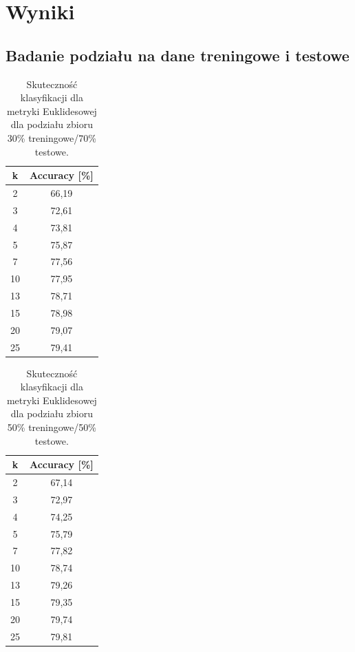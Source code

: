 \documentclass{classrep}
\begin{document}
\newpage
\section{Wyniki} %
\subsection{Badanie podziału na dane treningowe i testowe}

\begin{table}[h!]
	\centering
	\begin{tabular} {c c}
		\hline
		\textbf{k} & \textbf{Accuracy [\%]} \\ [0.5ex] 
		\hline
		\hline 
		2 & 66,19 \\ 
		3 & 72,61 \\
		4 & 73,81 \\
		5 & 75,87 \\
		7 & 77,56 \\
		10 & 77,95  \\
		13 & 78,71 \\ 
		15 & 78,98 \\
		20 & 79,07 \\
		25 & 79,41 \\
		\hline
	\end{tabular}
	\caption{Skuteczność klasyfikacji dla metryki Euklidesowej dla podziału zbioru 30\% treningowe/70\% testowe. }
\end{table}

\begin{table}[h!]
	\centering
	\begin{tabular} {c c}
		\hline
		\textbf{k} & \textbf{Accuracy [\%]} \\ [0.5ex] 
		\hline
		\hline 
		2 & 67,14 \\ 
		3 & 72,97 \\
		4 & 74,25 \\
		5 & 75,79 \\
		7 & 77,82 \\
		10 & 78,74  \\
		13 & 79,26 \\ 
		15 & 79,35 \\
		20 & 79,74 \\
		25 & 79,81 \\
		\hline
	\end{tabular}
	\caption{Skuteczność klasyfikacji dla metryki Euklidesowej dla podziału zbioru 50\% treningowe/50\% testowe. }
\end{table}
\end{document}
